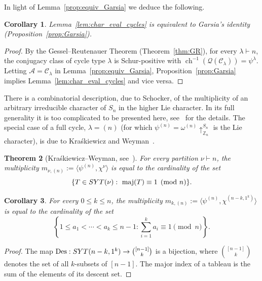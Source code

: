 \documentclass[10pt]{article}
\newtheorem{theorem}{Theorem}[section]
\newtheorem{corollary}[theorem]{Corollary}
\theoremstyle{definition}
\newcommand{\Q}{\mathcal Q}
\newcommand{\C}{\mathcal C}
\newcommand{\A}{\mathcal A}
\DeclareMathOperator\Des{Des}
\DeclareMathOperator\maj{maj}
\def\ZZ{{\mathbb Z}}
\newcommand{\ch}{{\operatorname{ch}}}
\def\SYT{{\rm SYT}}
\begin{document}
In light of Lemma~\ref{prop:equiv_Garsia} we deduce the following. 

\begin{corollary}
    Lemma~\ref{lem:char_eval_cycles} is equivalent to Garsia's identity (Proposition~\ref{prop:Garsia}).
\end{corollary}

\begin{proof}
    By the Gessel--Reutenauer Theorem (Theorem~\ref{thm:GR}), for every $\lambda \vdash n$, 
    the conjugacy class of cycle type $\lambda$ is Schur-positive with $\ch^{-1}(\Q(\C_\lambda))=\psi^\lambda$. 
    Letting $\A = \C_\lambda$ in Lemma~\ref{prop:equiv_Garsia}, 
    Proposition~\ref{prop:Garsia} implies Lemma~\ref{lem:char_eval_cycles} and vice versa.
\end{proof}

There is a combinatorial description, due to Schocker,
of the multiplicity of an arbitrary irreducible character of $S_n$ in the higher Lie character. 
In its full generality it is too complicated to be presented here, see~\cite{schocker} for the details. 
The special case of a full cycle, $\lambda=(n)$ (for which
$\psi^{(n)} = \omega^{(n)}\uparrow_{\ZZ_n}^{S_n}$ is the Lie character), is due 
to Kra\'skiewicz and Weyman~\cite{KraskiewiczWeyman}. 
	
\begin{theorem}[{Kra\'skiewicz--Weyman, see~\cite[Theorem 8.4]{Garsia}}]\label{thm:KW}
    For every partition \mbox{$\nu\vdash n$}, the multiplicity $m_{\nu,(n)} := \langle \psi^{(n)},\chi^{\nu} \rangle$ is equal to the cardinality of the set
    \[
        \{T \in \SYT(\nu):\ \maj(T) \equiv 1 \pmod n\}.
    \]	
\end{theorem}
	
\begin{corollary}\label{lem:Kra-Wey}
    For every $0\leq k\leq n$, the multiplicity 
    $m_{k,(n)} := \langle \psi^{(n)},\chi^{(n-k,1^k)} \rangle$ 
    is equal to the cardinality of the set
    \[
        \left\{ 1 \le a_1 < \cdots < a_k \le n-1 : \sum_{i=1}^k a_i \equiv 1 \!\!\!\!\pmod{n} \right\}.
    \]
\end{corollary}
	
\begin{proof}
    The map $\Des: \SYT(n-k,1^k) \rightarrow \binom{[n-1]}{k}$ is a bijection, where $\binom{[n-1]}{k}$ denotes the set of all $k$-subsets of $[n-1]$.
    The major index of a tableau is the sum of the elements of its descent set.
\end{proof}
	
\end{document}
